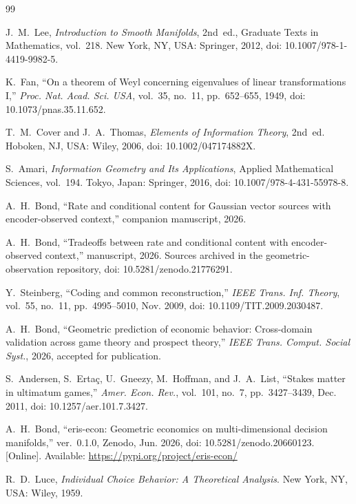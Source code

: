 \documentclass[11pt]{article}
\theoremstyle{definition}
\theoremstyle{remark}
\begin{document}
\begin{thebibliography}{99}

J.~M.~Lee, \emph{Introduction to Smooth Manifolds}, 2nd~ed., Graduate Texts in Mathematics, vol.~218. New York, NY, USA: Springer, 2012, doi: 10.1007/978-1-4419-9982-5.

K.~Fan, ``On a theorem of Weyl concerning eigenvalues of linear transformations I,'' \emph{Proc. Nat. Acad. Sci. USA}, vol.~35, no.~11, pp.~652--655, 1949, doi: 10.1073/pnas.35.11.652.

T.~M.~Cover and J.~A.~Thomas, \emph{Elements of Information Theory}, 2nd~ed. Hoboken, NJ, USA: Wiley, 2006, doi: 10.1002/047174882X.

S.~Amari, \emph{Information Geometry and Its Applications}, Applied Mathematical Sciences, vol.~194. Tokyo, Japan: Springer, 2016, doi: 10.1007/978-4-431-55978-8.

A.~H.~Bond, ``Rate and conditional content for Gaussian vector sources with encoder-observed context,'' companion manuscript, 2026.

A.~H.~Bond, ``Tradeoffs between rate and conditional content with encoder-observed context,'' manuscript, 2026. Sources archived in the geometric-observation repository, doi: 10.5281/zenodo.21776291.

Y.~Steinberg, ``Coding and common reconstruction,'' \emph{IEEE Trans. Inf. Theory}, vol.~55, no.~11, pp.~4995--5010, Nov. 2009, doi: 10.1109/TIT.2009.2030487.

A.~H.~Bond, ``Geometric prediction of economic behavior: Cross-domain validation across game theory and prospect theory,'' \emph{IEEE Trans. Comput. Social Syst.}, 2026, accepted for publication.

S.~Andersen, S.~Erta\c{c}, U.~Gneezy, M.~Hoffman, and J.~A.~List, ``Stakes matter in ultimatum games,'' \emph{Amer. Econ. Rev.}, vol.~101, no.~7, pp.~3427--3439, Dec. 2011, doi: 10.1257/aer.101.7.3427.

A.~H.~Bond, ``eris-econ: Geometric economics on multi-dimensional decision manifolds,'' ver.~0.1.0, Zenodo, Jun. 2026, doi: 10.5281/zenodo.20660123. [Online]. Available: \url{https://pypi.org/project/eris-econ/}

R.~D.~Luce, \emph{Individual Choice Behavior: A Theoretical Analysis}. New York, NY, USA: Wiley, 1959.


\end{thebibliography}
\end{document}
